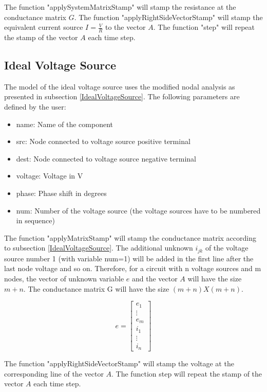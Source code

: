 The function "applySystemMatrixStamp" will stamp the resistance at the conductance matrix $G$.
The function "applyRightSideVectorStamp" will stamp the equivalent current source $I=\frac{V}{R}$ to the vector $A$.
The function "step" will repeat the stamp of the vector $A$ each time step.

\subsection{Ideal Voltage Source}

The model of the ideal voltage source uses the modified nodal analysis as presented in subsection \ref{IdealVoltageSource}.
The following parameters are defined by the user:

\begin{itemize}
\item name: Name of the component
\item src: Node connected to voltage source positive terminal
\item dest: Node connected to voltage source negative terminal
\item voltage: Voltage in V
\item phase: Phase shift in degrees
\item num: Number of the voltage source (the voltage sources have to be numbered in sequence) 
\end{itemize}

The function "applyMatrixStamp" will stamp the conductance matrix according to subsection \ref{IdealVoltageSource}. The additional unknown $i_{jk}$ of the voltage source number 1 (with variable num=1) will be added in the first line after the last node voltage and so on. Therefore, for a circuit with n voltage sources and m nodes, the vector of unknown variable $e$ and the vector $A$ will have the size $m+n$. The conductance matrix G will have the size $(m+n)X(m+n)$.

\begin{equation}
	e=
	\begin{bmatrix}
		e_1 \\
		\vdots \\
		e_m \\
		i_1 \\
		\vdots \\
		i_n
	\end{bmatrix}
\end{equation}

The function "applyRightSideVectorStamp" will stamp the voltage at the corresponding line of the vector $A$.
The function step will repeat the stamp of the vector $A$ each time step.

